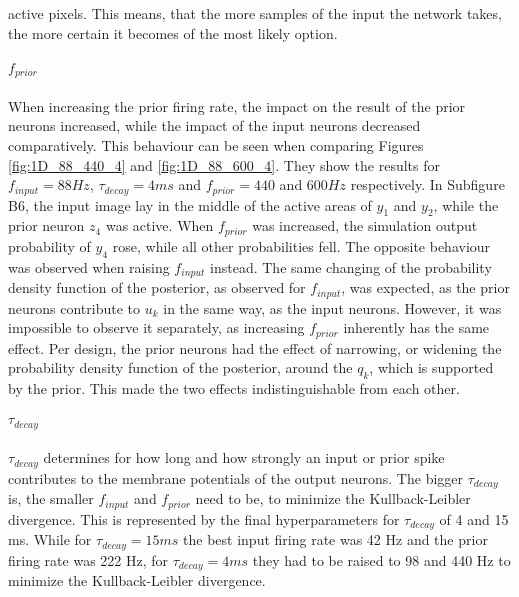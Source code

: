 active pixels. This means, that the more samples of the input the network takes, the more certain it becomes of the most likely option.

\paragraph{$f_{prior}$} When increasing the prior firing rate, the impact on the result of the prior neurons increased, while the impact of the input neurons decreased comparatively. This behaviour can be seen when comparing Figures \ref{fig:1D_88_440_4} and \ref{fig:1D_88_600_4}. They show the results for $f_{input} = 88 Hz$, $\tau_{decay} = 4 ms$ and $f_{prior} = 440$ and $600 Hz$ respectively. In Subfigure B6, the input image lay in the middle of the active areas of $y_1$ and $y_2$, while the prior neuron $z_4$ was active. When $f_{prior}$ was increased, the simulation output probability of $y_4$ rose, while all other probabilities fell. The opposite behaviour was observed when raising $f_{input}$ instead. The same changing of the probability density function of the posterior, as observed for $f_{input}$, was expected, as the prior neurons contribute to $u_k$ in the same way, as the input neurons. However, it was impossible to observe it separately, as increasing $f_{prior}$ inherently has the same effect. Per design, the prior neurons had the effect of narrowing, or widening the probability density function of the posterior, around the $q_k$, which is supported by the prior. This made the two effects indistinguishable from each other.

\paragraph{$\tau_{decay}$} $\tau_{decay}$ determines for how long and how strongly an input or prior spike contributes to the membrane potentials of the output neurons. The bigger $\tau_{decay}$ is, the smaller $f_{input}$ and $f_{prior}$ need to be, to minimize the Kullback-Leibler divergence. This is represented by the final hyperparameters for $\tau_{decay}$ of 4 and 15 ms. While for $\tau_{decay} = 15 ms$ the best input firing rate was 42 Hz and the prior firing rate was 222 Hz, for $\tau_{decay} = 4 ms$ they had to be raised to 98 and 440 Hz to minimize the Kullback-Leibler divergence.


